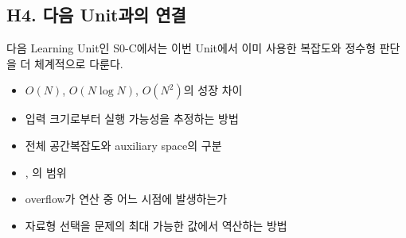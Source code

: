 \subsection{H4. 다음 Unit과의 연결}
다음 Learning Unit인 S0-C에서는 이번 Unit에서 이미 사용한 복잡도와 정수형 판단을 더 체계적으로 다룬다.
\begin{itemize}
  \item $O(N)$, $O(N\log N)$, $O(N^2)$의 성장 차이
  \item 입력 크기로부터 실행 가능성을 추정하는 방법
  \item 전체 공간복잡도와 auxiliary space의 구분
  \item {}, 의 범위
  \item overflow가 연산 중 어느 시점에 발생하는가
  \item 자료형 선택을 문제의 최대 가능한 값에서 역산하는 방법
\end{itemize}

